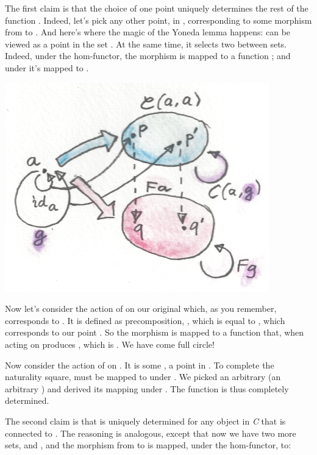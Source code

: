 The first claim is that the choice of one point  uniquely
determines the rest of the function . Indeed, let's pick any
other point,  in , corresponding to
some morphism  from  to . And here's where
the magic of the Yoneda lemma happens:  can be viewed as a
point  in the set . At the same time,
it selects two  between sets. Indeed, under the
hom-functor, the morphism  is mapped to a function
; and under  it's mapped to .

\includegraphics{images/yoneda4.png}

Now let's consider the action of  on our original
 which, as you remember, corresponds to . It is
defined as precomposition, , which is equal to ,
which corresponds to our point . So the morphism
 is mapped to a function that, when acting on 
produces , which is . We have come full
circle!

Now consider the action of  on . It is some
, a point in . To complete the naturality
square,  must be mapped to  under
. We picked an arbitrary  (an arbitrary
) and derived its mapping under . The function
 is thus completely determined.

The second claim is that  is uniquely determined for any
object  in \emph{C} that is connected to . The
reasoning is analogous, except that now we have two more sets,
 and , and the morphism  from
 to  is mapped, under the hom-functor, to:

